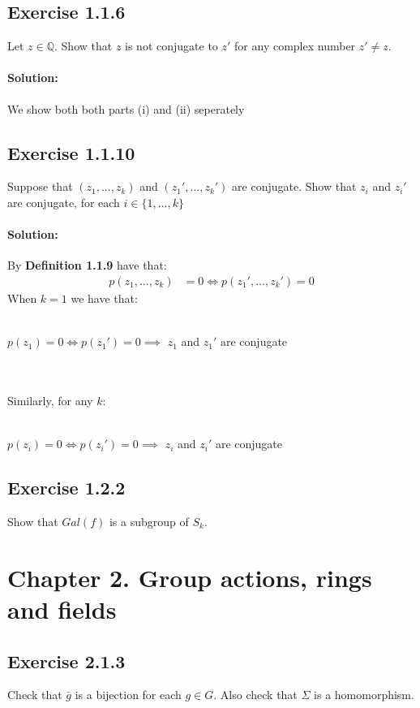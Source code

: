 \documentclass{article}
\begin{document}
\subsection*{Exercise 1.1.6} 
Let $z \in \mathbb{Q}$. Show that $z$ is not conjugate to $z'$ for any complex number $z' \neq z$.

\paragraph{Solution:} We show both both parts (i) and (ii) seperately

\subsection*{Exercise 1.1.10}
Suppose that $(z_1, ..., z_k)$ and $(z_1', ..., z_k')$ are conjugate. Show that $z_i$ and $z_i'$ are conjugate, for each $i \in \{1, ..., k\}$

\paragraph{Solution:} By \textbf{Definition 1.1.9} have that:
    \begin{equation*}
        \begin{aligned}
            p(z_1, ..., z_k) & = 0 \Longleftrightarrow p(z_1', ..., z_k')=0
        \end{aligned}
    \end{equation*}
\noindent
When $k=1$ we have that:
\\\\
\centerline{$p(z_1)=0 \Longleftrightarrow p(z_1') = 0 \implies$  $z_1$ and $z_1'$ are conjugate}
\\\\
Similarly, for any $k$:
\\\\
\centerline{$p(z_i)=0 \Longleftrightarrow p(z_i') = 0 \implies$  $z_i$ and $z_i'$ are conjugate}

\subsection*{Exercise 1.2.2}
Show that $Gal(f)$ is a subgroup of $S_k$.


\section*{Chapter 2. Group actions, rings and fields}

\subsection*{Exercise 2.1.3}
Check that $\bar g$ is a bijection for each $g \in G$. Also check that $\Sigma$ is a homomorphism.
\end{document}
